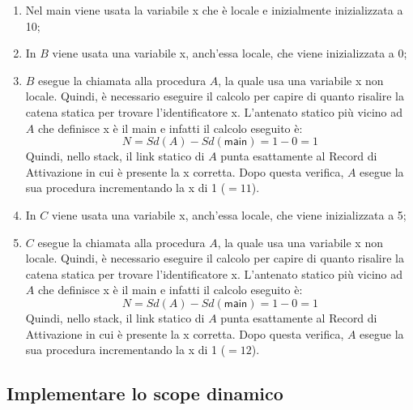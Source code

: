 \documentclass[a4paper]{article}
\begin{document}
	\begin{enumerate}
		\item Nel \textsf{main} viene usata la variabile \textsf{x} che è locale e inizialmente inizializzata a 10;
		
		\item In $B$ viene usata una variabile \textsf{x}, anch'essa locale, che viene inizializzata a 0;
		
		\item $B$ esegue la chiamata alla procedura $A$, la quale usa una variabile \textsf{x} non locale. Quindi, è necessario eseguire il calcolo per capire di quanto risalire la catena statica per trovare l'identificatore \textsf{x}. L'antenato statico più vicino ad $A$ che definisce \textsf{x} è il \textsf{main} e infatti il calcolo eseguito è:
		\begin{equation*}
			N = Sd\left(A\right) - Sd\left(\textsf{main}\right) = 1 - 0 = 1
		\end{equation*}
		Quindi, nello stack, il link statico di $A$ punta esattamente al Record di Attivazione in cui è presente la \textsf{x} corretta.\newline
		Dopo questa verifica, $A$ esegue la sua procedura incrementando la \textsf{x} di 1 ($= 11$).
		
		\item In $C$ viene usata una variabile \textsf{x}, anch'essa locale, che viene inizializzata a 5;
		
		\item $C$ esegue la chiamata alla procedura $A$, la quale usa una variabile \textsf{x} non locale. Quindi, è necessario eseguire il calcolo per capire di quanto risalire la catena statica per trovare l'identificatore \textsf{x}. L'antenato statico più vicino ad $A$ che definisce \textsf{x} è il \textsf{main} e infatti il calcolo eseguito è:
		\begin{equation*}
			N = Sd\left(A\right) - Sd\left(\textsf{main}\right) = 1 - 0 = 1
		\end{equation*}
		Quindi, nello stack, il link statico di $A$ punta esattamente al Record di Attivazione in cui è presente la \textsf{x} corretta.\newline
		Dopo questa verifica, $A$ esegue la sua procedura incrementando la \textsf{x} di 1 ($= 12$).
	\end{enumerate}\newpage
	
	\subsection{Implementare lo scope dinamico}
	
\end{document}
